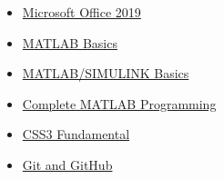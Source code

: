 \documentclass[10pt,a4paper,sans]{moderncv} %
\begin{document}
\begin{itemize}
\begin{multicols}{2}
\begin{itemize}
				\vspace{0.29 em}  
				
				
                \item {}  \href{https://www.udemy.com/course/microsoft-office-excel-word-access-powerpoint/}{Microsoft Office 2019}

				\vspace{0.20 em} 
				

				
				\vspace{0.20 em} 
				
				\item  {} \href{https://matlabacademy.mathworks.com/progress/share/report.html?id=fd5ec139-af9f-4fae-9cc5-6574358ca3ef}{MATLAB Basics} 
				
				
				\vspace{0.29 em} 
				
				\item  {}  \href{https://www.udemy.com/course/matlabsimulink-biblego-from-zero-to-hero/}{MATLAB/SIMULINK Basics}
				
				
				\vspace{0.29 em}   
				
				
				


				
				\vspace{-0.10 em}  
				
				\item  {} \href{https://www.udemy.com/course/matlab4b/}{Complete MATLAB Programming} 
				
			
			
				

				\vspace{0.24 em} 
				
				
				\item{} \href{https://www.udemy.com/course/css3-fundamental-estilize-seus-projetos-web/}{CSS3 Fundamental} 
				
				
			    \item {\large{}} \href{https://www.udemy.com/course/gitandgithubforbeginners/}{Git and GitHub }
				

\end{itemize}
\end{multicols}
\end{itemize}
\end{document}
